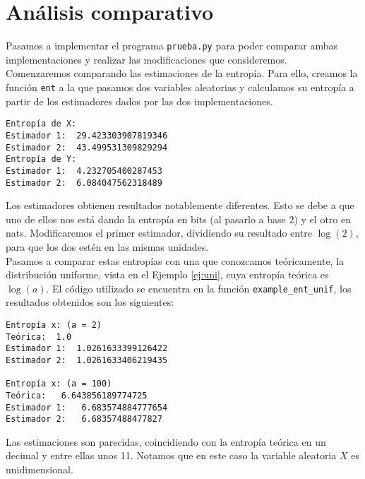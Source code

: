 \documentclass[12pt,a4paper]{report} %
\theoremstyle{definition}
\begin{document}
\section{Análisis comparativo}

Pasamos a implementar el programa \texttt{prueba.py} para poder comparar ambas implementaciones y realizar las modificaciones que consideremos.\\

Comenzaremos comparando las estimaciones de la entropía. Para ello, creamos la función \texttt{ent} a la que pasamos dos variables aleatorias y calculamos su entropía a partir de los estimadores dados por las dos implementaciones.

\begin{lstlisting}
Entropía de X:
Estimador 1:  29.423303907819346
Estimador 2:  43.499531309829294
Entropía de Y:
Estimador 1:  4.232705400287453
Estimador 2:  6.084047562318489

\end{lstlisting}

Los estimadores obtienen resultados notablemente diferentes. Esto se debe a que uno de ellos nos está dando la entropía en bits (al pasarlo a base 2) y el otro en nats. Modificaremos el primer estimador, dividiendo su resultado entre $\log(2)$, para que los dos estén en las mismas unidades.\\

Pasamos a comparar estas entropías con una que conozcamos teóricamente, la distribución uniforme, vista en el Ejemplo \ref{ej:uni}, cuya entropía teórica es $\log(a)$. El código utilizado se encuentra en la función \texttt{example\_ent\_unif}, los resultados obtenidos son los siguientes:

\begin{lstlisting}
Entropía x: (a = 2)
Teórica:  1.0
Estimador 1:  1.0261633399126422
Estimador 2:  1.0261633406219435

Entropía x: (a = 100)
Teórica:   6.643856189774725
Estimador 1:   6.683574884777654
Estimador 2:   6.68357488477827

\end{lstlisting}

Las estimaciones son parecidas, coincidiendo con la entropía teórica en un decimal y entre ellas unos 11. Notamos que en este caso la variable aleatoria $X$ es unidimensional.\\
\end{document}
